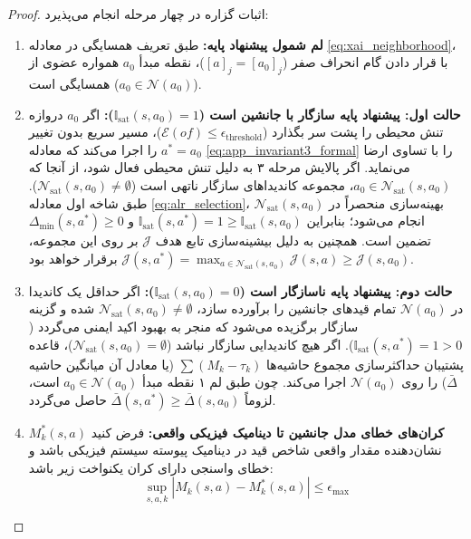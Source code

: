 \documentclass[oneside,openany,phd]{TMU-Thesis}
\begin{document}
\begin{proof}
اثبات گزاره در چهار مرحله انجام می‌پذیرد:
\begin{enumerate}
    \item \textbf{لم شمول پیشنهاد پایه:} طبق تعریف همسایگی در معادله \ref{eq:xai_neighborhood}، با قرار دادن گام انحراف صفر ($[a]_j = [a_0]_j$)، نقطه مبدأ $a_0$ همواره عضوی از همسایگی است ($a_0 \in \mathcal{N}(a_0)$).
    
    \item \textbf{حالت اول: پیشنهاد پایه سازگار با جانشین است ($\mathbb{I}_{\text{sat}}(s, a_0) = 1$):}
    اگر $a_0$ دروازه تنش محیطی را پشت سر بگذارد ($\mathcal{E}(of) \le \epsilon_{\text{threshold}}$)، مسیر سریع بدون تغییر $a^* = a_0$ را اجرا می‌کند که معادله \ref{eq:app_invariant3_formal} را با تساوی ارضا می‌نماید. اگر پالایش مرحله ۳ به دلیل تنش محیطی فعال شود، از آنجا که $a_0 \in \mathcal{N}_{\text{sat}}(s, a_0)$، مجموعه کاندیداهای سازگار ناتهی است ($\mathcal{N}_{\text{sat}}(s, a_0) \neq \emptyset$). طبق شاخه اول معادله \ref{eq:alr_selection}، بهینه‌سازی منحصراً در $\mathcal{N}_{\text{sat}}(s, a_0)$ انجام می‌شود؛ بنابراین $\mathbb{I}_{\text{sat}}(s, a^*) = 1 \ge \mathbb{I}_{\text{sat}}(s, a_0)$ و $\Delta_{\min}(s, a^*) \ge 0$ تضمین است. همچنین به دلیل بیشینه‌سازی تابع هدف $\mathcal{J}$ بر روی این مجموعه، $\mathcal{J}(s, a^*) = \max_{a \in \mathcal{N}_{\text{sat}}(s, a_0)} \mathcal{J}(s, a) \ge \mathcal{J}(s, a_0)$ برقرار خواهد بود.
    
    \item \textbf{حالت دوم: پیشنهاد پایه ناسازگار است ($\mathbb{I}_{\text{sat}}(s, a_0) = 0$):}
    اگر حداقل یک کاندیدا در $\mathcal{N}(a_0)$ تمام قیدهای جانشین را برآورده سازد، $\mathcal{N}_{\text{sat}}(s, a_0) \neq \emptyset$ شده و گزینه سازگار برگزیده می‌شود که منجر به بهبود اکید ایمنی می‌گردد ($\mathbb{I}_{\text{sat}}(s, a^*) = 1 > 0$). اگر هیچ کاندیدایی سازگار نباشد ($\mathcal{N}_{\text{sat}}(s, a_0) = \emptyset$)، قاعده پشتیبان حداکثرسازی مجموع حاشیه‌ها $\sum (M_k - \tau_k)$ (یا معادل آن میانگین حاشیه $\bar{\Delta}$) را روی $\mathcal{N}(a_0)$ اجرا می‌کند. چون طبق لم ۱ نقطه مبدأ $a_0 \in \mathcal{N}(a_0)$ است، لزوماً $\bar{\Delta}(s, a^*) \ge \bar{\Delta}(s, a_0)$ حاصل می‌گردد.
    
    \item \textbf{کران‌های خطای مدل جانشین تا دینامیک فیزیکی واقعی:}
    فرض کنید $M^*_k(s, a)$ نشان‌دهنده مقدار واقعی شاخص قید در دینامیک پیوسته سیستم فیزیکی باشد و خطای واسنجی دارای کران یکنواخت زیر باشد:
    \[
    \sup_{s, a, k} |M_k(s, a) - M^*_k(s, a)| \le \epsilon_{\max}
    \]
    

\end{enumerate}
\end{proof}
\end{document}
